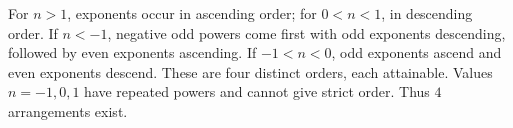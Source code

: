 For $n>1$, exponents occur in ascending order; for $0<n<1$, in descending order. If $n<-1$, negative odd powers come first with odd exponents descending, followed by even exponents ascending. If $-1<n<0$, odd exponents ascend and even exponents descend. These are four distinct orders, each attainable. Values $n=-1,0,1$ have repeated powers and cannot give strict order. Thus $\boxed4$ arrangements exist.
